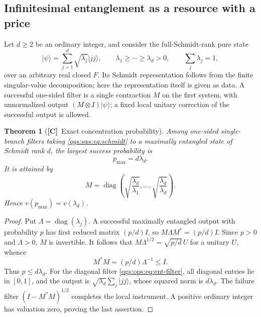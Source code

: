 \documentclass[11pt,oneside]{article}
\numberwithin{equation}{section}
\theoremstyle{plain}
\newtheorem{theorem}{Theorem}[section]
\theoremstyle{definition}
\theoremstyle{remark}
\DeclareMathOperator{\diag}{diag}
\newcommand{\ket}[1]{\lvert#1\rangle}
\newcommand{\TC}{\textcolor{TierC}{\textsf{\bfseries[C]}}}
\begin{document}
\subsection{Infinitesimal entanglement as a resource with a price}\label{qgs:ops:sec:entanglement}
Let $d\ge2$ be an ordinary integer, and consider the full-Schmidt-rank pure state
\begin{equation}\label{qgs:ops:eq:schmidt}
 \ket\psi=\sum_{j=1}^d\sqrt{\lambda_j}\ket{jj},\qquad
 \lambda_1\ge\cdots\ge\lambda_d>0,\qquad
 \sum_j\lambda_j=1,
\end{equation}
over an arbitrary real closed $F$. Its Schmidt representation follows from the finite singular-value decomposition; here the representation itself is given as data. A successful one-sided filter is a single contraction $M$ on the first system, with unnormalized output $(M\otimes I)\ket\psi$; a fixed local unitary correction of the successful output is allowed.

\begin{theorem}[\TC\ Exact concentration probability]\label{qgs:ops:thm:entanglement}
Among one-sided single-branch filters taking \eqref{qgs:ops:eq:schmidt} to a maximally entangled state of Schmidt rank $d$, the largest success probability is
\begin{equation}\label{qgs:ops:eq:ent-probability}
 p_{\max}=d\lambda_d.
\end{equation}
It is attained by
\begin{equation}\label{qgs:ops:eq:ent-filter}
 M=\diag\left(\sqrt{\frac{\lambda_d}{\lambda_1}},\ldots,
                 \sqrt{\frac{\lambda_d}{\lambda_d}}\right).
\end{equation}
Hence $v(p_{\max})=v(\lambda_d)$.
\end{theorem}
\begin{proof}
Put $\Lambda=\diag(\lambda_j)$. A successful maximally entangled output with probability $p$ has first reduced matrix $(p/d)I$, so $M\Lambda M^*=(p/d)I$. Since $p>0$ and $\Lambda>0$, $M$ is invertible. It follows that $M\Lambda^{1/2}=\sqrt{p/d}\,U$ for a unitary $U$, whence
\[
 M^*M=(p/d)\Lambda^{-1}\le I.
\]
Thus $p\le d\lambda_d$. For the diagonal filter \eqref{qgs:ops:eq:ent-filter}, all diagonal entries lie in $[0,1]$, and the output is $\sqrt{\lambda_d}\sum_j\ket{jj}$, whose squared norm is $d\lambda_d$. The failure filter $(I-M^*M)^{1/2}$ completes the local instrument. A positive ordinary integer has valuation zero, proving the last assertion.
\end{proof}
\end{document}
